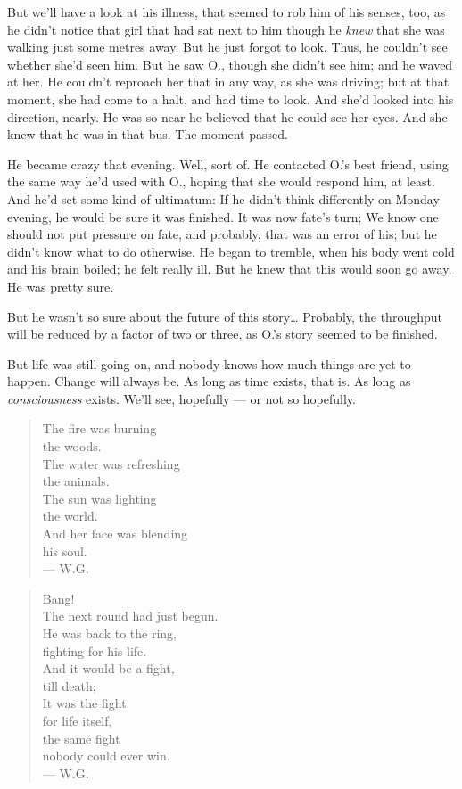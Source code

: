 But we'll have a look at his illness, that seemed to rob him of his senses, too, as he didn't notice that girl that had sat next to him though he \emph{knew} that she was walking just some metres away. 
But he just forgot to look. 
Thus, he couldn't see whether she'd seen him. 
But he saw O., though she didn't see him; and he waved at her. 
He couldn't reproach her that in any way, as she was driving; but at that moment, she had come to a halt, and had time to look. 
And she'd looked into his direction, nearly. 
He was so near he believed that he could see her eyes. 
And she knew that he was in that bus. 
The moment passed. 

He became crazy that evening. 
Well, sort of. 
He contacted O.'s best friend, using the same way he'd used with O., hoping that she would respond him, at least. 
And he'd set some kind of ultimatum: If he didn't think differently on Monday evening, he would be sure it was finished. It was now fate's turn; We know one should not put pressure on fate, and probably, that was an error of his; but he didn't know what to do otherwise. 
He began to tremble, when his body went cold and his brain boiled; he felt really ill. 
But he knew that this would soon go away. 
He was pretty sure.

But he wasn't so sure about the future of this story\ldots
Probably, the throughput will be reduced by a factor of two or three, as O.'s story seemed to be finished.

But life was still going on, and nobody knows how much things are yet to happen.
Change will always be. 
As long as time exists, that is. 
As long as \emph{consciousness} exists. 
We'll see, hopefully --- or not so hopefully. 

\begin{quote}
The fire was burning \\
the woods. \\
The water was refreshing \\
the animals. \\
The sun was lighting \\
the world. \\
And her face was blending \\
his soul. \\
--- W.G.
\end{quote}

\begin{quote}
Bang!\\
The next round had just begun. \\
He was back to the ring, \\
fighting for his life. \\
And it would be a fight, \\
till death; \\
It was the fight \\
for life itself, \\
the same fight \\
nobody could ever win. \\
--- W.G.
\end{quote}
